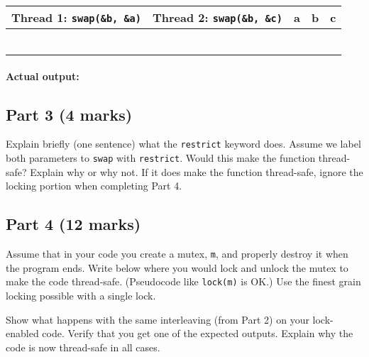 \documentclass[12pt]{article}
\begin{document}
\begin{center}
\begin{tabular}{l|l|l|l|l}
  {\bf Thread 1: \verb+swap(&b, &a)+} & {\bf Thread 2: \verb+swap(&b, &c)+} & {\bf a} &{\bf b } & {\bf c} \\ \hline
  &&&& \\ \hline
  &&&& \\ \hline
  &&&& \\ \hline
  &&&& \\ \hline
  &&&& \\ \hline
  &&&& \\ \hline
\end{tabular}
\end{center}

\paragraph{Actual output:}

\subsection*{Part 3 (4 marks)}

Explain briefly (one sentence) what the {\tt restrict} keyword
does. Assume we label both parameters to {\tt swap} with
{\tt restrict}. Would this make the function thread-safe? Explain
why or why not. If it does make the function thread-safe, ignore the locking portion when completing Part 4.

\subsection*{Part 4 (12 marks)}
Assume that in your code you create a mutex, {\tt m},
and properly destroy it when the program ends. Write below where
you would lock and unlock the mutex to make the code thread-safe.
(Pseudocode like {\tt lock(m)} is OK.) Use the finest grain locking
possible with a single lock.


Show what happens with the same interleaving (from Part 2) on
your lock-enabled code. Verify that you get one of the expected
outputs. Explain why the code is now thread-safe in all cases.
\end{document}
